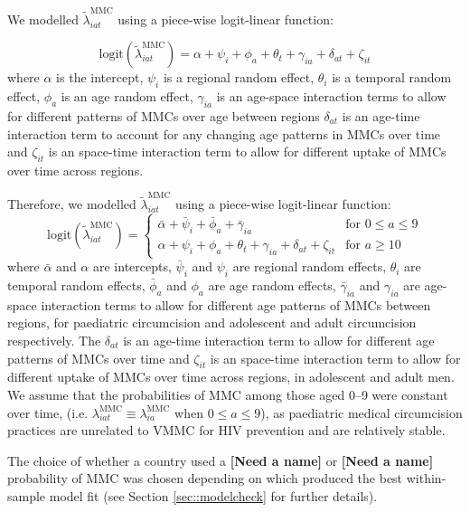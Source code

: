 \documentclass{article}
\begin{document}
\begin{appendix}
We modelled $\tilde{\lambda}^{\text{MMC}}_{iat}$ using a piece-wise logit-linear function:

\begin{equation*}
	\text{logit}(\tilde{\lambda}^{\text{MMC}}_{iat}) = \alpha + \psi_i + \phi_a + \theta_t + \gamma_{ia} + \delta_{at} + \zeta_{it} 
\end{equation*}
where $\alpha$ is the intercept, $\psi_i$ is a regional random effect, $\theta_i$ is a temporal random effect, $\phi_a$ is an age random effect, $\gamma_{ia}$ is an age-space interaction terms to allow for different patterns of MMCs over age between regions $\delta_{at}$ is an age-time interaction term to account for any changing age patterns in MMCs over time and $\zeta_{it}$ is an space-time interaction term to allow for different uptake of MMCs over time across regions. 


Therefore, we modelled $\tilde{\lambda}^{\text{MMC}}_{iat}$ using a piece-wise logit-linear function:
\begin{equation*}
	\text{logit}(\tilde{\lambda}^{\text{MMC}}_{iat}) =
	\begin{cases}
		\bar{\alpha} + \bar{\psi}_i + \bar{\phi}_a + \bar{\gamma}_{ia} & \text{for } 0 \leq a \leq 9\\
		\alpha + \psi_i + \phi_a + \theta_t + \gamma_{ia} + \delta_{at} + \zeta_{it} & \text{for } a \geq 10
	\end{cases} 
\end{equation*}
where $\bar{\alpha}$ and $\alpha$ are intercepts, $\bar{\psi}_i$ and $\psi_i$ are regional random effects, $\theta_i$ are temporal random effects, $\bar{\phi}_a$ and $\phi_a$ are age random effects, $\bar{\gamma}_{ia}$ and $\gamma_{ia}$ are age-space interaction terms to allow for different age patterns of MMCs between regions, for paediatric circumcision and adolescent and adult circumcision respectively. The $\delta_{at}$ is an age-time interaction term to allow for different age patterns of MMCs over time and $\zeta_{it}$ is an space-time interaction term to allow for different uptake of MMCs over time across regions, in adolescent and adult men. We assume that the probabilities of MMC among those aged 0--9 were constant over time, (i.e. $\lambda^{\text{MMC}}_{iat} \equiv \lambda^{\text{MMC}}_{ia}$ when $0\leq a \leq 9$), as paediatric medical circumcision practices are unrelated to VMMC for HIV prevention and are relatively stable. 

The choice of whether a country used a {\color{red}\bf[Need a name]} or {\color{red}\bf[Need a name]} probability of MMC was chosen depending on which produced the best within-sample model fit (see Section \ref{sec::modelcheck} for further details). 


\end{appendix}
\end{document}
